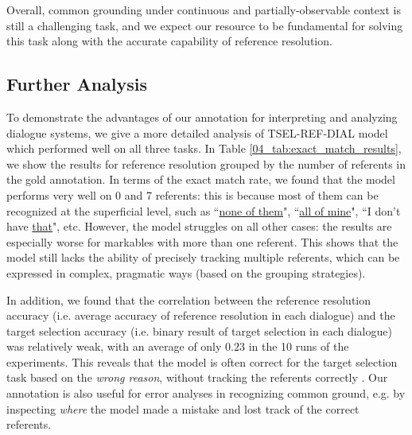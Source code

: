 Overall, common grounding under continuous and partially-observable context is still a challenging task, and we expect our resource to be fundamental for solving this task along with the accurate capability of reference resolution.

\subsection{Further Analysis}
\label{subsection:analysis}

To demonstrate the advantages of our annotation for interpreting and analyzing dialogue systems, we give a more detailed analysis of TSEL-REF-DIAL model which performed well on all three tasks. In Table \ref{04_tab:exact_match_results}, we show the results for reference resolution grouped by the number of referents in the gold annotation. In terms of the exact match rate, we found that the model performs very well on 0 and 7 referents: this is because most of them can be recognized at the superficial level, such as ``\underline{none of them}", ``\underline{all of mine}", ``I don't have \underline{that}", etc. However, the model struggles on all other cases: the results are especially worse for markables with more than one referent. This shows that the model still lacks the ability of precisely tracking multiple referents, which can be expressed in complex, pragmatic ways (based on the grouping strategies).

In addition, we found that the correlation between the reference resolution accuracy (i.e. average accuracy of reference resolution in each dialogue) and the target selection accuracy (i.e. binary result of target selection in each dialogue) was relatively weak, with an average of only $0.23$ in the 10 runs of the experiments. This reveals that the model is often correct for the target selection task based on the \textit{wrong reason}, without tracking the referents correctly \citep{mccoy-etal-2019-right}. Our annotation is also useful for error analyses in recognizing common ground, e.g. by inspecting \textit{where} the model made a mistake and lost track of the correct referents.


